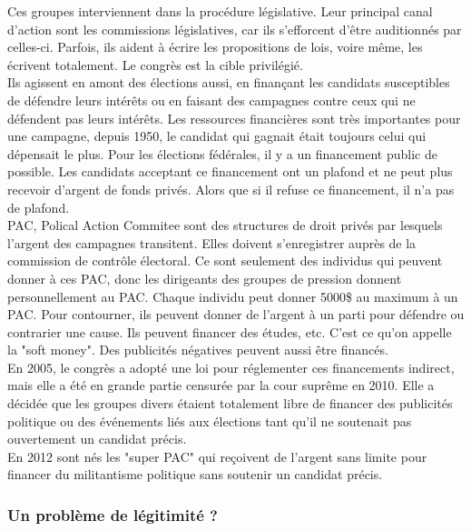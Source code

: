 \documentclass[10pt, a4paper, openany]{book}
\begin{document}
Ces groupes interviennent dans la procédure législative. Leur principal canal d'action sont les commissions législatives, car ils s'efforcent d'être auditionnés par celles-ci. Parfois, ils aident à écrire les propositions de lois, voire même, les écrivent totalement. Le congrès est la cible privilégié. \\
Ils agissent en amont des élections aussi, en finançant les candidats susceptibles de défendre leurs intérêts ou en faisant des campagnes contre ceux qui ne défendent pas leurs intérêts. Les ressources financières sont très importantes pour une campagne, depuis 1950, le candidat qui gagnait était toujours celui qui dépensait le plus. Pour les élections fédérales, il y a un financement public de possible. Les candidats acceptant ce financement ont un plafond et ne peut plus recevoir d'argent de fonds privés. Alors que si il refuse ce financement, il n'a pas de plafond. \\
PAC, Polical Action Commitee sont des structures de droit privés par lesquels l'argent des campagnes transitent. Elles doivent s'enregistrer auprès de la commission de contrôle électoral. Ce sont seulement des individus qui peuvent donner à ces PAC, donc les dirigeants des groupes de pression donnent personnellement au PAC. Chaque individu peut donner 5000\$ au maximum à un PAC. Pour contourner, ils peuvent donner de l'argent à un parti pour défendre ou contrarier une cause. Ils peuvent financer des études, etc. C'est ce qu'on appelle la "soft money". Des publicités négatives peuvent aussi être financés. \\
En 2005, le congrès a adopté une loi pour réglementer ces financements indirect, mais elle a été en grande partie censurée par la cour suprême en 2010. Elle a décidée que les groupes divers étaient totalement libre de financer des publicités politique ou des événements liés aux élections tant qu'il ne soutenait pas ouvertement un candidat précis. \\
En 2012 sont nés les "super PAC" qui reçoivent de l'argent sans limite pour financer du militantisme politique sans soutenir un candidat précis. 

\subsubsection{Un problème de légitimité ?}
\end{document}
